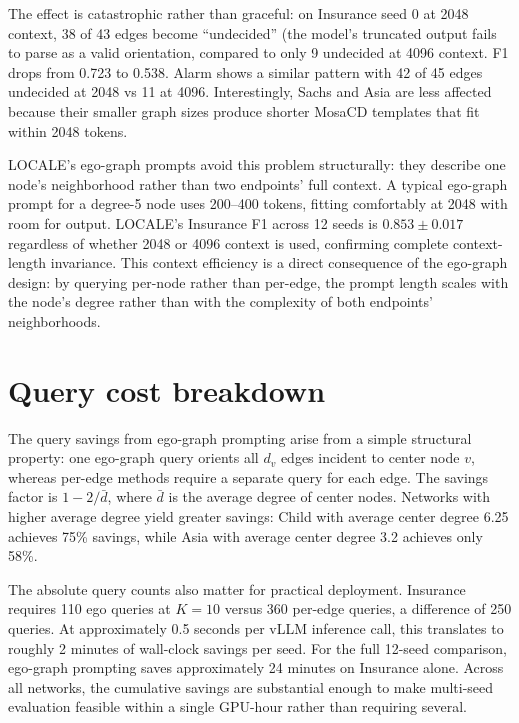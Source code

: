 \documentclass{article} %
\begin{document}
The effect is catastrophic rather than graceful: on Insurance seed 0 at 2048 context, 38 of 43 edges become ``undecided'' (the model's truncated output fails to parse as a valid orientation, compared to only 9 undecided at 4096 context. F1 drops from 0.723 to 0.538. Alarm shows a similar pattern with 42 of 45 edges undecided at 2048 vs 11 at 4096. Interestingly, Sachs and Asia are less affected because their smaller graph sizes produce shorter MosaCD templates that fit within 2048 tokens.

LOCALE's ego-graph prompts avoid this problem structurally: they describe one node's neighborhood rather than two endpoints' full context. A typical ego-graph prompt for a degree-5 node uses 200--400 tokens, fitting comfortably at 2048 with room for output. LOCALE's Insurance F1 across 12 seeds is $0.853 \pm 0.017$ regardless of whether 2048 or 4096 context is used, confirming complete context-length invariance. This context efficiency is a direct consequence of the ego-graph design: by querying per-node rather than per-edge, the prompt length scales with the node's degree rather than with the complexity of both endpoints' neighborhoods.

\section{Query cost breakdown}
\label{app:queries}

The query savings from ego-graph prompting arise from a simple structural property: one ego-graph query orients all $d_v$ edges incident to center node $v$, whereas per-edge methods require a separate query for each edge. The savings factor is $1 - 2/\bar{d}$, where $\bar{d}$ is the average degree of center nodes. Networks with higher average degree yield greater savings: Child with average center degree 6.25 achieves 75\% savings, while Asia with average center degree 3.2 achieves only 58\%.

The absolute query counts also matter for practical deployment. Insurance requires 110 ego queries at $K{=}10$ versus 360 per-edge queries, a difference of 250 queries. At approximately 0.5 seconds per vLLM inference call, this translates to roughly 2 minutes of wall-clock savings per seed. For the full 12-seed comparison, ego-graph prompting saves approximately 24 minutes on Insurance alone. Across all networks, the cumulative savings are substantial enough to make multi-seed evaluation feasible within a single GPU-hour rather than requiring several.
\end{document}
